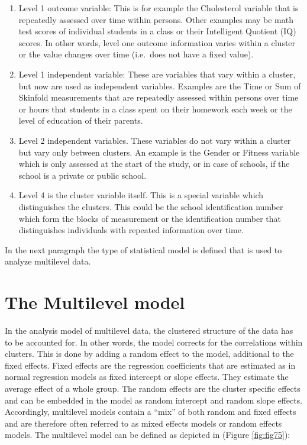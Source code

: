 \documentclass[]{book}
\theoremstyle{definition}
\theoremstyle{definition}
\theoremstyle{definition}
\theoremstyle{remark}
\begin{document}
\begin{enumerate}
\def\labelenumi{\arabic{enumi})}
\item
  Level 1 outcome variable: This is for example the Cholesterol variable
  that is repeatedly assessed over time within persons. Other examples
  may be math test scores of individual students in a class or their
  Intelligent Quotient (IQ) scores. In other words, level one outcome
  information varies within a cluster or the value changes over time
  (i.e.~does not have a fixed value).
\item
  Level 1 independent variable: These are variables that vary within a
  cluster, but now are used as independent variables. Examples are the
  Time or Sum of Skinfold measurements that are repeatedly assessed
  within persons over time or hours that students in a class spent on
  their homework each week or the level of education of their parents.
\item
  Level 2 independent variables. These variables do not vary within a
  cluster but vary only between clusters. An example is the Gender or
  Fitness variable which is only assessed at the start of the study, or
  in case of schools, if the school is a private or public school.
\item
  Level 4 is the cluster variable itself. This is a special variable
  which distinguishes the clusters. This could be the school
  identification number which form the blocks of measurement or the
  identification number that distinguishes individuals with repeated
  information over time.
\end{enumerate}

In the next paragraph the type of statistical model is defined that is
used to analyze multilevel data.

\section{The Multilevel model}\label{the-multilevel-model}

In the analysis model of multilevel data, the clustered structure of the
data has to be accounted for. In other words, the model corrects for the
correlations within clusters. This is done by adding a random effect to
the model, additional to the fixed effects. Fixed effects are the
regression coefficients that are estimated as in normal regression
models as fixed intercept or slope effects. They estimate the average
effect of a whole group. The random effects are the cluster specific
effects and can be embedded in the model as random intercept and random
slope effects. Accordingly, multilevel models contain a ``mix'' of both
random and fixed effects and are therefore often referred to as mixed
effects models or random effects models. The multilevel model can be
defined as depicted in (Figure \ref{fig:fig75}):
\end{document}
